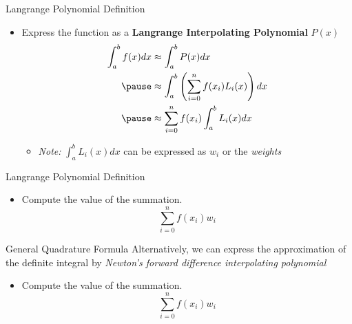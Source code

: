 \documentclass{beamer}
\begin{document}
\begin{frame}{Langrange Polynomial Definition}
    \begin{itemize}
        \item Express the function as a \textbf{Langrange Interpolating Polynomial} $P(x)$ \pause
       \begin{equation} \label{quadrature}
        \begin{aligned}
          \int_{a}^{b} f(x) dx &\approx \int_{a}^{b} P(x) dx \\ \pause
          &\approx \int_{a}^{b} \left(\sum_{i=0}^{n} f(x_i) L_i(x)\right) dx \\ \pause
          &\approx \sum_{i=0}^{n} f(x_i) \int_{a}^{b} L_i(x) dx
        \end{aligned}        
       \end{equation} \pause
       \begin{itemize}
         \item \textit{Note:} $\int_{a}^{b} L_i(x) dx$ can be expressed as $w_i$ or the \textit{weights}
       \end{itemize}
    \end{itemize}
\end{frame}

\begin{frame}{Langrange Polynomial Definition}
    \begin{itemize}
      \item Compute the value of the summation.
      \begin{equation}
        \sum_{i=0}^{n} f(x_i) w_i
      \end{equation}
    \end{itemize}
\end{frame}

\begin{frame}{General Quadrature Formula \cite{general_quadrature}}
  Alternatively, we can express the approximation of the definite integral by \textit{Newton's forward difference interpolating polynomial}
    \begin{itemize}
      \item Compute the value of the summation.
      \begin{equation}
        \sum_{i=0}^{n} f(x_i) w_i
      \end{equation}
    \end{itemize}
\end{frame}
\end{document}
